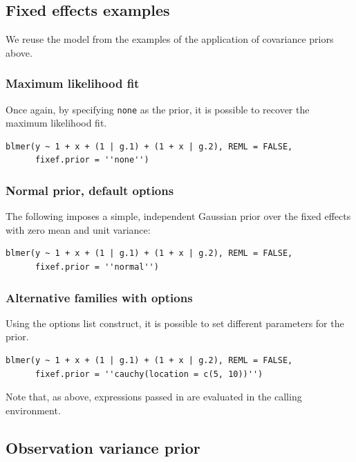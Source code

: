 \documentclass[10pt]{article}
\newcommand{\code}[1]{\texttt{#1}}
\begin{document}
\subsection[Fixed effects examples]{Fixed effects examples}

We reuse the model from the examples of the application of covariance
priors above.

\subsubsection*{Maximum likelihood fit}

Once again, by specifying \code{none} as the prior, it is possible to
recover the maximum likelihood fit.

\begin{verbatim}
blmer(y ~ 1 + x + (1 | g.1) + (1 + x | g.2), REML = FALSE,
      fixef.prior = ''none'')
\end{verbatim}

\subsubsection*{Normal prior, default options}

The following imposes a simple, independent Gaussian prior over the fixed effects
with zero mean and unit variance:

\begin{verbatim}
blmer(y ~ 1 + x + (1 | g.1) + (1 + x | g.2), REML = FALSE,
      fixef.prior = ''normal'')
\end{verbatim}

\subsubsection*{Alternative families with options}

Using the options list construct, it is possible to set different
parameters for the prior.

\begin{verbatim}
blmer(y ~ 1 + x + (1 | g.1) + (1 + x | g.2), REML = FALSE,
      fixef.prior = ''cauchy(location = c(5, 10))'')
\end{verbatim}

Note that, as above, expressions passed in are evaluated in the
calling environment.

\subsection{Observation variance prior}
\end{document}
